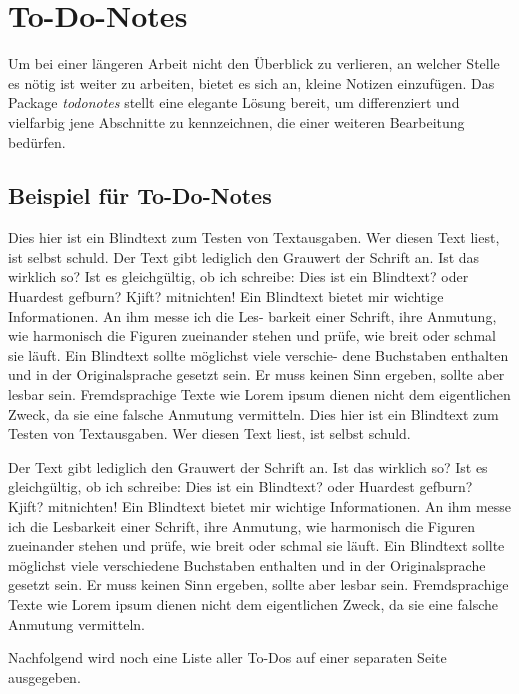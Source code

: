 \clearpage\section{To-Do-Notes}
Um bei einer längeren Arbeit nicht den Überblick zu verlieren, an welcher Stelle es nötig ist
weiter zu arbeiten, bietet es sich an, kleine Notizen einzufügen. Das Package \textit{todonotes}
stellt eine elegante Lösung bereit, um differenziert und vielfarbig jene Abschnitte zu kennzeichnen,
die einer weiteren Bearbeitung bedürfen.

\subsection*{Beispiel für To-Do-Notes}
Dies hier ist ein Blindtext zum Testen von Textausgaben. Wer diesen Text liest, ist selbst
 schuld. Der Text gibt lediglich den Grauwert der Schrift an. Ist das wirklich so? Ist es
gleichgültig, ob ich schreibe: Dies ist ein Blindtext? oder Huardest gefburn? Kjift?
mitnichten! Ein Blindtext bietet mir wichtige Informationen. An ihm messe ich die Les-
barkeit einer Schrift, ihre Anmutung, wie harmonisch die Figuren zueinander stehen
und prüfe, wie breit oder schmal sie läuft. Ein Blindtext sollte möglichst viele verschie-
dene Buchstaben enthalten und in der Originalsprache gesetzt sein. Er muss keinen
Sinn ergeben, sollte aber lesbar sein.%
Fremdsprachige Texte wie Lorem ipsum dienen
nicht dem eigentlichen Zweck, da sie eine falsche Anmutung vermitteln. Dies hier ist
ein Blindtext zum Testen von Textausgaben. Wer diesen Text liest, ist selbst schuld. 


Der Text gibt lediglich den Grauwert der Schrift an. Ist das wirklich so? Ist es gleichgültig,
ob ich schreibe: Dies ist ein Blindtext? oder Huardest gefburn? Kjift? mitnichten!
Ein Blindtext bietet mir wichtige Informationen. An ihm messe ich die Lesbarkeit einer
Schrift, ihre Anmutung, wie harmonisch die Figuren zueinander stehen und prüfe, wie
breit oder schmal sie läuft. Ein Blindtext sollte möglichst viele verschiedene Buchstaben
enthalten und in der Originalsprache gesetzt sein. Er muss keinen Sinn ergeben, sollte
aber lesbar sein. Fremdsprachige Texte wie Lorem ipsum dienen nicht dem eigentlichen Zweck, 
da sie eine falsche Anmutung vermitteln.


Nachfolgend wird noch eine Liste aller To-Dos auf einer separaten 
Seite ausgegeben.
	\listoftodos
